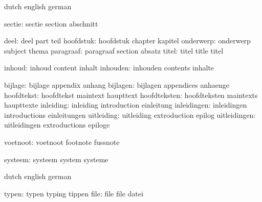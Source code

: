 \stopvariables




\startvariables       dutch                english             german

             sectie:  sectie               section             abschnitt

               deel:  deel                 part                teil
          hoofdstuk:  hoofdstuk            chapter             kapitel
          onderwerp:  onderwerp            subject             thema
          paragraaf:  paragraaf            section             absatz
              titel:  titel                title               titel

             inhoud:  inhoud               content             inhalt
           inhouden:  inhouden             contents            inhalte

            bijlage:  bijlage              appendix            anhang
           bijlagen:  bijlagen             appendices          anhaenge
         hoofdtekst:  hoofdtekst           maintext            haupttext
       hoofdteksten:  hoofdteksten         maintexts           haupttexte
          inleiding:  inleiding            introduction        einleitung
        inleidingen:  inleidingen          introductions       einleitungen
         uitleiding:  uitleiding           extroduction        epilog
       uitleidingen:  uitleidingen         extroductions       epiloge

           voetnoot:  voetnoot             footnote            fussnote

            systeem:  systeem              system              systeme

\stopvariables

\startvariables       dutch                english             german

              typen:  typen                typing              tippen
               file:  file                 file                datei

\stopvariables



